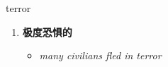 
\begin{frame}
{\huge terror}
\begin{center}
\begin{enumerate}\Large
  \item \textbf{极度恐惧的}
  \begin{itemize}
    \item \em{\Large{many civilians fled in terror}}
  \end{itemize}
\end{enumerate}
\end{center}
\end{frame}
